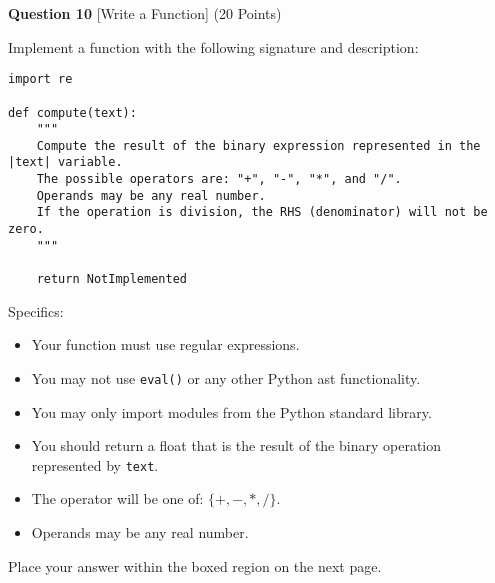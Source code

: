 \documentclass{article}
\newcommand*{\calcremainingheight}{%
    \ifdim\pagegoal=\maxdimen
        \remainingheight\dimexpr\textheight-0.4pt\relax
    \else
        \remainingheight\dimexpr\pagegoal-\pagetotal-\lineskip-0.4pt\relax
    \fi
}
\begin{document}

\vspace{1.0cm}


\begin{minipage}{\textwidth}
    \noindent
    \textbf{Question 10} [Write a Function] (20 Points)
    \vspace{0.25cm}

    \noindent
    Implement a function with the following signature and description:

\begin{lstlisting}
import re

def compute(text):
    """
    Compute the result of the binary expression represented in the |text| variable.
    The possible operators are: "+", "-", "*", and "/".
    Operands may be any real number.
    If the operation is division, the RHS (denominator) will not be zero.
    """

    return NotImplemented
\end{lstlisting}

Specifics:
\begin{itemize}
    \item Your function must use regular expressions.
    \item You may not use \verb|eval()| or any other Python ast functionality.
    \item You may only import modules from the Python standard library.
    \item You should return a float that is the result of the binary operation represented by \verb|text|.
    \item The operator will be one of:  $ \{+, -, *, /\} $.
    \item Operands may be any real number.
\end{itemize}


    \vspace{0.25cm}
    Place your answer within the boxed region on the next page.
    \vspace{0.25cm}

\end{minipage}
\newpage
\begin{minipage}{\textwidth}

    \calcremainingheight
\end{minipage}

\end{document}

